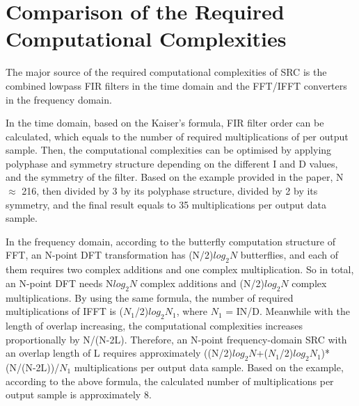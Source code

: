 \documentclass[letterpaper,12pt]{article}
\begin{document}
\section{Comparison of the Required Computational Complexities}

The major source of the required computational complexities of SRC is the combined lowpass  FIR filters in the time domain and the FFT/IFFT converters in the frequency domain.

In the time domain, based on the Kaiser's formula, FIR filter order can be calculated, which equals to the number of required multiplications of per output sample. Then, the computational complexities can be optimised by applying polyphase and symmetry structure depending on the different I and D values, and the symmetry of the filter. Based on the example provided in the paper, N $\approx$ 216, then divided by 3 by  its polyphase structure, divided by 2 by its symmetry, and the final result equals to 35 multiplications per output data sample.

In the frequency domain, according to the butterfly computation structure of FFT, an N-point DFT transformation has (N/2)$log_{2}N$ butterflies, and each of them requires two complex additions and one complex multiplication. So in total, an N-point DFT needs N$log_{2}N$ complex additions and (N/2)$log_{2}N$ complex multiplications. By using the same formula, the number of required multiplications of IFFT is ($N_{1}$/2)$log_{2}$$N_{1}$, where $N_{1}$ = IN/D. Meanwhile with the length of overlap increasing, the computational complexities increases proportionally by N/(N-2L). Therefore, an N-point frequency-domain SRC with an overlap length of L requires approximately ((N/2)$log_{2}N$+($N_{1}$/2)$log_{2}$$N_{1}$)*(N/(N-2L))/$N_{1}$ multiplications per output data sample. Based on the example, according to the above formula, the calculated number of multiplications per output sample is approximately 8.
\end{document}
